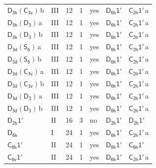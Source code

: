 \documentclass[10pt,a4paper]{article}
\numberwithin{equation}{section}
\newcommand{\grp}[1]{\mathsf{#1}}
\newcommand{\clsletter}[1]{\,{\scriptsize\color{black!55}#1}}
\begin{document}
{\begin{longtable}{@{}llrrlll@{}}
\href{D3h-C3v.pdf}{$\grp{D_{3h}}(\grp{C_{3v}})$}\clsletter{b} & III & 12 & 1 & yes & \href{D6h-1p.pdf}{$\grp{D_{6h}1'}$} & \href{C2h-1p.pdf}{$\grp{C_{2h}1'}$}\clsletter{a}\\
\href{D3h-D3.pdf}{$\grp{D_{3h}}(\grp{D_{3}})$}\clsletter{a} & III & 12 & 1 & yes & \href{D6h-1p.pdf}{$\grp{D_{6h}1'}$} & \href{C2h-1p.pdf}{$\grp{C_{2h}1'}$}\clsletter{a}\\
\href{D3h-D3.pdf}{$\grp{D_{3h}}(\grp{D_{3}})$}\clsletter{b} & III & 12 & 1 & yes & \href{D6h-1p.pdf}{$\grp{D_{6h}1'}$} & \href{C2h-1p.pdf}{$\grp{C_{2h}1'}$}\clsletter{a}\\
\href{D3d-S6.pdf}{$\grp{D_{3d}}(\grp{S_{6}})$}\clsletter{a} & III & 12 & 1 & yes & \href{D6h-1p.pdf}{$\grp{D_{6h}1'}$} & \href{C2h-1p.pdf}{$\grp{C_{2h}1'}$}\clsletter{a}\\
\href{D3d-S6.pdf}{$\grp{D_{3d}}(\grp{S_{6}})$}\clsletter{b} & III & 12 & 1 & yes & \href{D6h-1p.pdf}{$\grp{D_{6h}1'}$} & \href{C2h-1p.pdf}{$\grp{C_{2h}1'}$}\clsletter{a}\\
\href{D3d-C3v.pdf}{$\grp{D_{3d}}(\grp{C_{3v}})$}\clsletter{a} & III & 12 & 1 & yes & \href{D6h-1p.pdf}{$\grp{D_{6h}1'}$} & \href{C2h-1p.pdf}{$\grp{C_{2h}1'}$}\clsletter{a}\\
\href{D3d-C3v.pdf}{$\grp{D_{3d}}(\grp{C_{3v}})$}\clsletter{b} & III & 12 & 1 & yes & \href{D6h-1p.pdf}{$\grp{D_{6h}1'}$} & \href{C2h-1p.pdf}{$\grp{C_{2h}1'}$}\clsletter{a}\\
\href{D3d-D3.pdf}{$\grp{D_{3d}}(\grp{D_{3}})$}\clsletter{a} & III & 12 & 1 & yes & \href{D6h-1p.pdf}{$\grp{D_{6h}1'}$} & \href{C2h-1p.pdf}{$\grp{C_{2h}1'}$}\clsletter{a}\\
\href{D3d-D3.pdf}{$\grp{D_{3d}}(\grp{D_{3}})$}\clsletter{b} & III & 12 & 1 & yes & \href{D6h-1p.pdf}{$\grp{D_{6h}1'}$} & \href{C2h-1p.pdf}{$\grp{C_{2h}1'}$}\clsletter{a}\\
\href{D2h-1p.pdf}{$\grp{D_{2h}1'}$} & II & 16 & 3 & no & \href{D2h-1p.pdf}{$\grp{D_{2h}1'}$} & \href{D2h-1p.pdf}{$\grp{D_{2h}1'}$}\\
\href{../../../rotation/data/pdf/D6h.pdf}{$\grp{D_{6h}}$} & I & 24 & 1 & yes & \href{D6h-1p.pdf}{$\grp{D_{6h}1'}$} & \href{C2h-1p.pdf}{$\grp{C_{2h}1'}$}\clsletter{a}\\
\href{C6h-1p.pdf}{$\grp{C_{6h}1'}$} & II & 24 & 1 & yes & \href{D6h-1p.pdf}{$\grp{D_{6h}1'}$} & \href{C6h-1p.pdf}{$\grp{C_{6h}1'}$}\\
\href{C6v-1p.pdf}{$\grp{C_{6v}1'}$} & II & 24 & 1 & yes & \href{D6h-1p.pdf}{$\grp{D_{6h}1'}$} & \href{C2h-1p.pdf}{$\grp{C_{2h}1'}$}\clsletter{a}\\

\end{longtable}}
\end{document}
